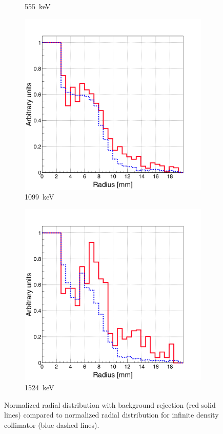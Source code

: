 \begin{figure}
\begin{subfigure}{.5\textwidth}
  \caption{555~keV}
  \label{fig:rad_distr_infAbs_555keV}
\end{subfigure}
\begin{subfigure}{.5\textwidth}
  \centering
  \includegraphics[width=.9\linewidth]{03_GraphicFiles/chapter4/SPECT/anger/inf_abs/overlap_infAbs_1099keV_normMax}
  \caption{1099~keV}
  \label{fig:rad_distr_infAbs_1099keV}
\end{subfigure}
\begin{subfigure}{.5\textwidth}
  \centering
  \includegraphics[width=.9\linewidth]{03_GraphicFiles/chapter4/SPECT/anger/inf_abs/overlap_infAbs_1524keV_normMax}
  \caption{1524~keV}
  \label{fig:rad_distr_infAbs_1524keV}
\end{subfigure}
\caption{Normalized radial distribution with background rejection (red solid lines) compared to normalized radial distribution for infinite density collimator (blue dashed lines).}
\label{fig:distr_infAbs}
\end{figure}


